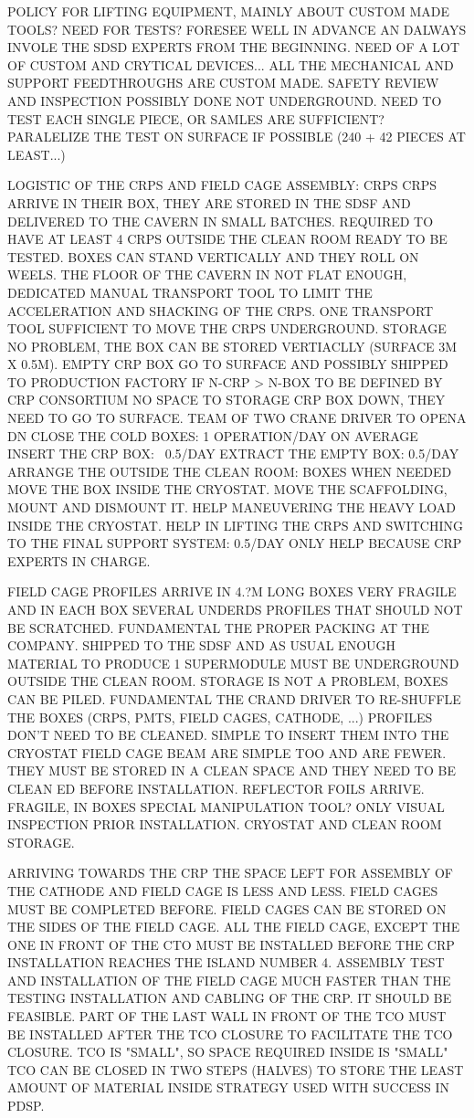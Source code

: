 POLICY FOR LIFTING EQUIPMENT, MAINLY ABOUT CUSTOM MADE TOOLS? NEED FOR TESTS? FORESEE WELL IN ADVANCE AN DALWAYS INVOLE THE SDSD EXPERTS FROM THE BEGINNING.
NEED OF A LOT OF CUSTOM AND CRYTICAL DEVICES...
ALL THE MECHANICAL AND SUPPORT FEEDTHROUGHS ARE CUSTOM MADE.
SAFETY REVIEW AND INSPECTION POSSIBLY DONE NOT UNDERGROUND.
NEED TO TEST EACH SINGLE PIECE, OR SAMLES ARE SUFFICIENT?
PARALELIZE THE TEST ON SURFACE IF POSSIBLE (240 + 42 PIECES AT LEAST...)

LOGISTIC OF THE CRPS AND FIELD CAGE ASSEMBLY:
CRPS
CRPS ARRIVE IN THEIR BOX, THEY ARE STORED IN THE SDSF AND DELIVERED TO THE CAVERN IN SMALL BATCHES.
REQUIRED TO HAVE AT LEAST 4 CRPS OUTSIDE THE CLEAN ROOM READY TO BE TESTED.
BOXES CAN STAND VERTICALLY AND THEY ROLL ON WEELS.
THE FLOOR OF THE CAVERN IN NOT FLAT ENOUGH, DEDICATED MANUAL TRANSPORT TOOL TO LIMIT THE ACCELERATION AND SHACKING OF THE CRPS.
ONE TRANSPORT TOOL SUFFICIENT TO MOVE THE CRPS UNDERGROUND.
STORAGE NO PROBLEM, THE BOX CAN BE STORED VERTIACLLY (SURFACE 3M X 0.5M).
EMPTY CRP BOX GO TO SURFACE AND POSSIBLY SHIPPED TO PRODUCTION FACTORY IF N-CRP > N-BOX TO BE DEFINED BY CRP CONSORTIUM
NO SPACE TO STORAGE CRP BOX DOWN, THEY NEED TO GO TO SURFACE.
TEAM OF TWO CRANE DRIVER TO OPENA DN CLOSE THE COLD BOXES: 1 OPERATION/DAY ON AVERAGE
INSERT THE CRP BOX: ~0.5/DAY
EXTRACT THE EMPTY BOX: 0.5/DAY
ARRANGE THE OUTSIDE THE CLEAN ROOM: BOXES WHEN NEEDED
MOVE THE BOX INSIDE THE CRYOSTAT.
MOVE THE SCAFFOLDING, MOUNT AND DISMOUNT IT.
HELP MANEUVERING THE HEAVY LOAD INSIDE THE CRYOSTAT.
HELP IN LIFTING THE CRPS AND SWITCHING TO THE FINAL SUPPORT SYSTEM: 0.5/DAY
ONLY HELP BECAUSE CRP EXPERTS IN CHARGE.

FIELD CAGE
PROFILES ARRIVE IN 4.?M LONG BOXES
VERY FRAGILE AND IN EACH BOX SEVERAL UNDERDS PROFILES THAT SHOULD NOT BE SCRATCHED. FUNDAMENTAL THE PROPER PACKING AT THE COMPANY.
SHIPPED TO THE SDSF AND AS USUAL ENOUGH MATERIAL TO PRODUCE 1 SUPERMODULE MUST BE UNDERGROUND OUTSIDE THE CLEAN ROOM.
STORAGE IS NOT A PROBLEM, BOXES CAN BE PILED.
FUNDAMENTAL THE CRAND DRIVER TO RE-SHUFFLE THE BOXES (CRPS, PMTS, FIELD CAGES, CATHODE, ...)
PROFILES DON'T NEED TO BE CLEANED.
SIMPLE TO INSERT THEM INTO THE CRYOSTAT
FIELD CAGE BEAM ARE SIMPLE TOO AND ARE FEWER.
THEY MUST BE STORED IN A CLEAN SPACE AND THEY NEED TO BE CLEAN ED BEFORE INSTALLATION.
REFLECTOR FOILS ARRIVE. FRAGILE, IN BOXES SPECIAL MANIPULATION TOOL?
ONLY VISUAL INSPECTION PRIOR INSTALLATION.
CRYOSTAT AND CLEAN ROOM STORAGE.

ARRIVING TOWARDS THE CRP THE SPACE LEFT FOR ASSEMBLY OF THE CATHODE AND FIELD CAGE IS LESS AND LESS.
FIELD CAGES MUST BE COMPLETED BEFORE.
FIELD CAGES CAN BE STORED ON THE SIDES OF THE FIELD CAGE.
ALL THE FIELD CAGE, EXCEPT THE ONE IN FRONT OF THE CTO MUST BE INSTALLED BEFORE THE CRP INSTALLATION REACHES THE ISLAND NUMBER 4.
ASSEMBLY TEST AND INSTALLATION OF THE FIELD CAGE MUCH FASTER THAN THE TESTING INSTALLATION AND CABLING OF THE CRP. IT SHOULD BE FEASIBLE.
PART OF THE LAST WALL IN FRONT OF THE TCO MUST BE INSTALLED AFTER THE TCO CLOSURE TO FACILITATE THE TCO CLOSURE.
TCO IS "SMALL", SO SPACE REQUIRED INSIDE IS "SMALL"
TCO CAN BE CLOSED IN TWO STEPS (HALVES) TO STORE THE LEAST AMOUNT OF MATERIAL INSIDE
STRATEGY USED WITH SUCCESS IN PDSP.


